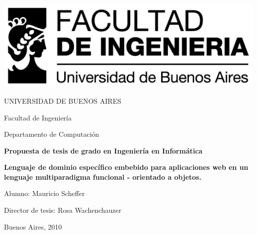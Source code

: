 \documentclass[12pt]{book}
\begin{document}
\thispagestyle{empty}

\begin {center}

\includegraphics[scale=.7]{logo_fiuba_alta.jpg}

\medskip
UNIVERSIDAD DE BUENOS AIRES

Facultad de Ingeniería

Departamento de Computación

\vspace{3cm}

\textbf{\large Propuesta de tesis de grado en Ingeniería en Informática}



\textbf{\large Lenguaje de dominio específico embebido para aplicaciones web en un lenguaje multiparadigma funcional - orientado a objetos.}

\vspace{2cm}

\end {center}
\vspace{1.5cm}

Alumno: Mauricio Scheffer

Director de tesis: Rosa Wachenchauzer

Buenos Aires, 2010

\newpage
\end{document}
